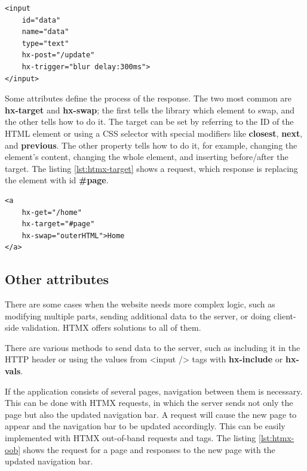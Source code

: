 \begin{lstlisting}[caption=Custom HTMX trigger,label=lst:htmx-trigger, float]
<input 
	id="data"
	name="data"
	type="text"
	hx-post="/update"
	hx-trigger="blur delay:300ms">
</input>
\end{lstlisting}

Some attributes define the process of the response. The two most common are \textbf{hx-target} and \textbf{hx-swap}; the first tells the library which element to swap, and the other tells how to do it. The target can be set by referring to the ID of the HTML element or using a CSS selector with special modifiers like \textbf{closest}, \textbf{next}, and \textbf{previous}. The other property tells how to do it, for example, changing the element's content, changing the whole element, and inserting before/after the target. The listing \ref{lst:htmx-target} shows a request, which response is replacing the element with id \textbf{\#page}.

\begin{lstlisting}[caption=Setting HTMX target,label=lst:htmx-target, float]
<a 
	hx-get="/home"
	hx-target="#page"
	hx-swap="outerHTML">Home
</a>
\end{lstlisting}

\subsection{Other attributes}
There are some cases when the website needs more complex logic, such as modifying multiple parts, sending additional data to the server, or doing client-side validation. HTMX offers solutions to all of them.

There are various methods to send data to the server, such as including it in the HTTP header or using the values from <input /> tags with \textbf{hx-include} or \textbf{hx-vals}.

If the application consists of several pages, navigation between them is necessary. This can be done with HTMX requests, in which the server sends not only the page but also the updated navigation bar. A request will cause the new page to appear and the navigation bar to be updated accordingly. This can be easily implemented with HTMX out-of-band requests and tags. The listing \ref{lst:htmx-oob} shows the request for a page and responses to the new page with the updated navigation bar.

